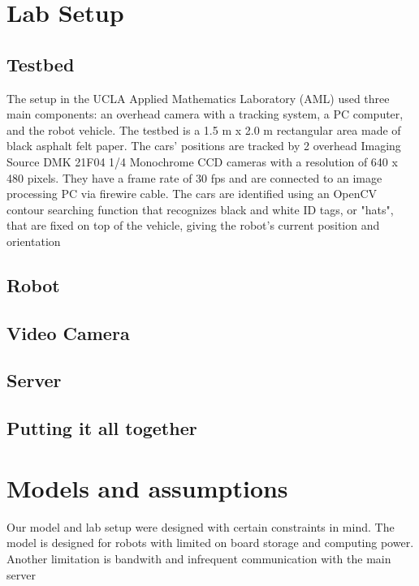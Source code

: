 \documentclass[english]{article}\usepackage[]{graphicx}\usepackage[]{color}
\begin{document}
\section{Lab Setup}
\subsection{Testbed}
The setup in the UCLA Applied Mathematics Laboratory (AML) used three main components: an overhead camera with a tracking system, a PC computer, and the robot vehicle. The testbed is a 1.5 m x 2.0 m rectangular area made of black asphalt felt paper. The cars' positions are tracked by 2 overhead Imaging Source DMK 21F04 1/4 Monochrome CCD cameras with a resolution of 640 x 480 pixels. They have a frame rate of 30 fps and are connected to an image processing PC via firewire cable. The cars are identified using an OpenCV contour searching function that recognizes black and white ID tags, or "hats", that are fixed on top of the vehicle, giving the robot's current position and orientation \cite{gonzalez2011third}

\subsection{Robot}
\subsection{Video Camera}
\subsection{Server}
\subsection{Putting it all together}

\section{Models and assumptions}
Our model and lab setup were designed with certain constraints in mind. The model is designed for robots with limited on board storage and computing power. Another limitation is bandwith and infrequent communication with the main server
\end{document}
